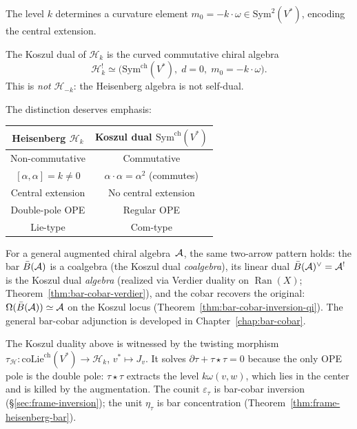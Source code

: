 The level $k$ determines a curvature element
$m_0 = -k \cdot \omega \in \mathrm{Sym}^2(V^*)$, encoding the
central extension.

\begin{theorem}
\label{thm:frame-heisenberg-koszul-dual}
The Koszul dual of $\mathcal{H}_k$ is the curved commutative
chiral algebra
\begin{equation}\label{eq:frame-koszul-dual}
\mathcal{H}_k^! \simeq \bigl(\mathrm{Sym}^{\mathrm{ch}}(V^*),\;
d = 0,\; m_0 = -k \cdot \omega\bigr).
\end{equation}
This is \emph{not} $\mathcal{H}_{-k}$: the Heisenberg algebra is
not self-dual.
\end{theorem}

The distinction deserves emphasis:
\begin{center}
\small
\begin{tabular}{c|c}
\textbf{Heisenberg} $\mathcal{H}_k$ &
\textbf{Koszul dual} $\mathrm{Sym}^{\mathrm{ch}}(V^*)$ \\
\hline
Non-commutative & Commutative \\
$[\alpha, \alpha] = k \neq 0$ &
$\alpha \cdot \alpha = \alpha^2$ (commutes) \\
Central extension & No central extension \\
Double-pole OPE & Regular OPE \\
Lie-type & Com-type
\end{tabular}
\end{center}

For a general augmented chiral algebra~$\mathcal{A}$, the same
two-arrow pattern holds: the bar $\bar{B}(\mathcal{A})$ is a coalgebra
(the Koszul dual \emph{coalgebra}), its linear dual
$\bar{B}(\mathcal{A})^\vee = \mathcal{A}^!$ is the Koszul dual \emph{algebra}
(realized via Verdier duality on $\operatorname{Ran}(X)$;
Theorem~\ref{thm:bar-cobar-verdier}), and the cobar recovers
the original: $\Omega(\bar{B}(\mathcal{A})) \simeq \mathcal{A}$ on the Koszul
locus (Theorem~\ref{thm:bar-cobar-inversion-qi}).  The general
bar-cobar adjunction is developed in
Chapter~\ref{chap:bar-cobar}.

\begin{remark}
\label{rem:frame-twisting-morphism}
The Koszul duality above is witnessed by the twisting morphism
$\tau_{\mathcal{H}} \colon \mathrm{coLie}^{\mathrm{ch}}(V^*)
\to \mathcal{H}_k$,
$v^* \mapsto J_v$.
It solves $\partial\tau + \tau \star \tau = 0$
because the only OPE pole is the double pole:
$\tau \star \tau$ extracts the level $k\omega(v,w)$,
which lies in the center and is killed by the augmentation.
The counit $\varepsilon_\tau$ is bar-cobar inversion
(\S\ref{sec:frame-inversion}); the unit $\eta_\tau$ is
bar concentration (Theorem~\ref{thm:frame-heisenberg-bar}).
\end{remark}

